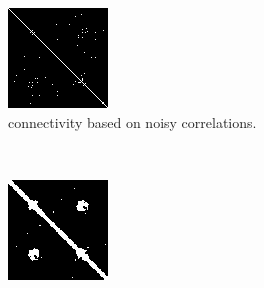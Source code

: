 \begin{figure}[p]
  \begin{subfigure}[t]{0.3\textwidth}
    \centering
    \includegraphics[width=\textwidth]{figures/method1/newtoy/threholdCorrRaw}
    \caption{connectivity based on noisy correlations.}
    \label{fig:6dconn4}
    \end{subfigure}
~
  \begin{subfigure}[t]{0.3\textwidth}
    \centering
    \includegraphics[width=\textwidth]{figures/method1/newtoy/threholdCorrSmoothed}

\end{subfigure}
\end{figure}
